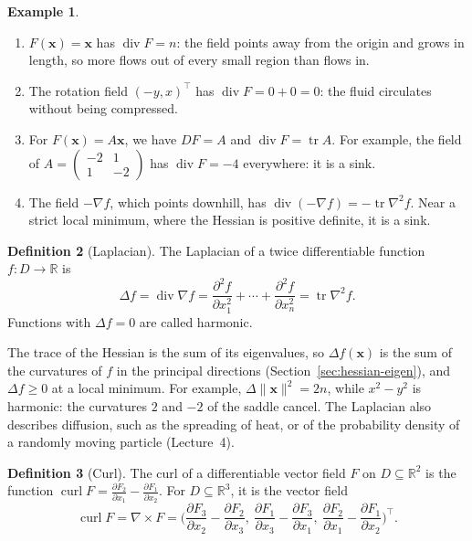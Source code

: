 \documentclass[11pt]{article}
\newcommand{\norm}[1]{\lVert #1 \rVert}
\theoremstyle{definition}
\newtheorem{definition}{Definition}[section]
\newtheorem{example}[definition]{Example}
\theoremstyle{plain}
\theoremstyle{remark}
\DeclareMathOperator{\tr}{tr}
\DeclareMathOperator{\Div}{div}
\DeclareMathOperator{\curl}{curl}
\begin{document}
\begin{example}\label{ex:divergence}
    \begin{enumerate}
        \item $F(\mathbf{x}) = \mathbf{x}$ has $\Div F = n$: the field points away from the origin and grows in length, so more flows out of every small region than flows in.
        \item The rotation field $(-y, x)^\top$ has $\Div F = 0 + 0 = 0$: the fluid circulates without being compressed.
        \item For $F(\mathbf{x}) = A\mathbf{x}$, we have $DF = A$ and $\Div F = \tr A$. For example, the field of $A = \left(\begin{smallmatrix} -2 & 1 \\ 1 & -2 \end{smallmatrix}\right)$ has $\Div F = -4$ everywhere: it is a sink.
        \item The field $-\nabla f$, which points downhill, has $\Div(-\nabla f) = -\tr\nabla^2 f$. Near a strict local minimum, where the Hessian is positive definite, it is a sink.
    \end{enumerate}
\end{example}

\begin{definition}[Laplacian]\label{def:laplacian}
    The Laplacian of a twice differentiable function $f: D \to \mathbb{R}$ is
    \[\Delta f = \Div\nabla f = \frac{\partial^2 f}{\partial x_1^2} + \cdots + \frac{\partial^2 f}{\partial x_n^2} = \tr\nabla^2 f.\]
    Functions with $\Delta f = 0$ are called harmonic.
\end{definition}

The trace of the Hessian is the sum of its eigenvalues, so $\Delta f(\mathbf{x})$ is the sum of the curvatures of $f$ in the principal directions (Section~\ref{sec:hessian-eigen}), and $\Delta f \geq 0$ at a local minimum. For example, $\Delta\norm{\mathbf{x}}^2 = 2n$, while $x^2 - y^2$ is harmonic: the curvatures $2$ and $-2$ of the saddle cancel. The Laplacian also describes diffusion, such as the spreading of heat, or of the probability density of a randomly moving particle (Lecture~4).

\begin{definition}[Curl]\label{def:curl}
    The curl of a differentiable vector field $F$ on $D \subseteq \mathbb{R}^2$ is the function $\curl F = \frac{\partial F_2}{\partial x_1} - \frac{\partial F_1}{\partial x_2}$. For $D \subseteq \mathbb{R}^3$, it is the vector field
    \[\curl F = \nabla \times F = \Big(\frac{\partial F_3}{\partial x_2} - \frac{\partial F_2}{\partial x_3}, \ \frac{\partial F_1}{\partial x_3} - \frac{\partial F_3}{\partial x_1}, \ \frac{\partial F_2}{\partial x_1} - \frac{\partial F_1}{\partial x_2}\Big)^\top.\]
\end{definition}
\end{document}
